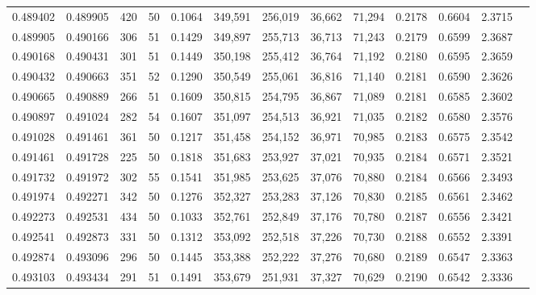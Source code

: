\begin{tabular}{rrrrrrrrrrrrr}
0.489402 & 0.489905 &   420 &  50 &                                     0.1064 & 349,591 & 256,019 &  36,662 &  71,294 & 0.2178 & 0.6604 & 2.3715 \\
0.489905 & 0.490166 &   306 &  51 &                                     0.1429 & 349,897 & 255,713 &  36,713 &  71,243 & 0.2179 & 0.6599 & 2.3687 \\
0.490168 & 0.490431 &   301 &  51 &                                     0.1449 & 350,198 & 255,412 &  36,764 &  71,192 & 0.2180 & 0.6595 & 2.3659 \\
0.490432 & 0.490663 &   351 &  52 &                                     0.1290 & 350,549 & 255,061 &  36,816 &  71,140 & 0.2181 & 0.6590 & 2.3626 \\
0.490665 & 0.490889 &   266 &  51 &                                     0.1609 & 350,815 & 254,795 &  36,867 &  71,089 & 0.2181 & 0.6585 & 2.3602 \\
0.490897 & 0.491024 &   282 &  54 &                                     0.1607 & 351,097 & 254,513 &  36,921 &  71,035 & 0.2182 & 0.6580 & 2.3576 \\
0.491028 & 0.491461 &   361 &  50 &                                     0.1217 & 351,458 & 254,152 &  36,971 &  70,985 & 0.2183 & 0.6575 & 2.3542 \\
0.491461 & 0.491728 &   225 &  50 &                                     0.1818 & 351,683 & 253,927 &  37,021 &  70,935 & 0.2184 & 0.6571 & 2.3521 \\
0.491732 & 0.491972 &   302 &  55 &                                     0.1541 & 351,985 & 253,625 &  37,076 &  70,880 & 0.2184 & 0.6566 & 2.3493 \\
0.491974 & 0.492271 &   342 &  50 &                                     0.1276 & 352,327 & 253,283 &  37,126 &  70,830 & 0.2185 & 0.6561 & 2.3462 \\
0.492273 & 0.492531 &   434 &  50 &                                     0.1033 & 352,761 & 252,849 &  37,176 &  70,780 & 0.2187 & 0.6556 & 2.3421 \\
0.492541 & 0.492873 &   331 &  50 &                                     0.1312 & 353,092 & 252,518 &  37,226 &  70,730 & 0.2188 & 0.6552 & 2.3391 \\
0.492874 & 0.493096 &   296 &  50 &                                     0.1445 & 353,388 & 252,222 &  37,276 &  70,680 & 0.2189 & 0.6547 & 2.3363 \\
0.493103 & 0.493434 &   291 &  51 &                                     0.1491 & 353,679 & 251,931 &  37,327 &  70,629 & 0.2190 & 0.6542 & 2.3336 \\

\end{tabular}
